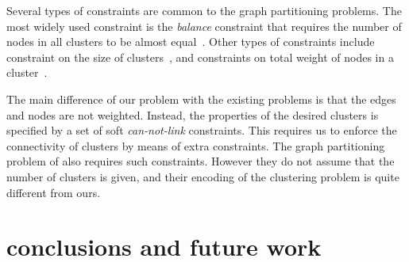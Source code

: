 \documentclass[conference,compsoc]{IEEEtran}
\begin{document}
Several types of constraints are common to the graph partitioning problems. The most widely used constraint is the \emph{balance} constraint that requires the number of nodes in all clusters to be almost equal~\cite{LabbeO10}. Other types of constraints include constraint on the size of clusters~\cite{FanP10}, and constraints on total weight of nodes in a cluster~\cite{FerreiraMSWW98}. 

The main difference of our problem with the existing problems is that the edges and nodes are not weighted. Instead, the properties of the desired clusters is specified by a set of soft \emph{can-not-link} constraints. This requires us to enforce the connectivity of clusters by means of extra constraints. The graph partitioning problem of \cite{Benati2017} also requires such constraints. However they do not assume that the number of clusters is given, and their encoding of the clustering problem is quite different from ours. 


\section{conclusions and future work}
\label{sec:conclusion}



\end{document}
